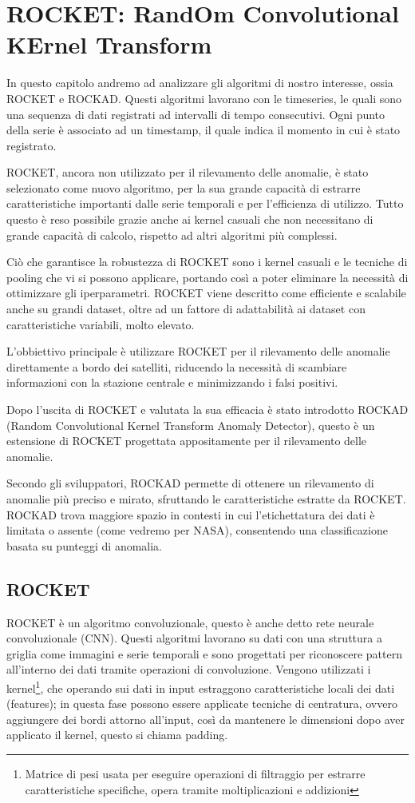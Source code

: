 \chapter{ ROCKET: RandOm Convolutional KErnel Transform}
In questo capitolo andremo ad analizzare gli algoritmi di nostro interesse, ossia ROCKET e ROCKAD.
Questi algoritmi lavorano con le timeseries, le quali sono una sequenza di dati registrati ad intervalli di tempo consecutivi. Ogni punto della serie è associato ad un timestamp, il quale indica il momento in cui è stato registrato.

ROCKET, ancora non utilizzato per il rilevamento delle anomalie, è stato selezionato come nuovo algoritmo, per la sua grande capacità di estrarre caratteristiche importanti dalle serie temporali e per l'efficienza di utilizzo.
Tutto questo è reso possibile grazie anche ai kernel casuali che non necessitano di grande capacità di calcolo, rispetto ad altri algoritmi più complessi.

Ciò che garantisce la robustezza di ROCKET sono i kernel casuali e le tecniche di pooling che vi si possono applicare, portando così a poter eliminare la necessità di ottimizzare gli iperparametri.
ROCKET viene descritto come efficiente e scalabile anche su grandi dataset, oltre ad un fattore di adattabilità ai dataset con caratteristiche variabili, molto elevato.

L'obbiettivo principale è utilizzare ROCKET per il rilevamento delle anomalie direttamente a bordo dei satelliti, riducendo la necessità di scambiare informazioni con la stazione centrale e minimizzando i falsi positivi.

Dopo l'uscita di ROCKET e valutata la sua efficacia è stato introdotto ROCKAD (Random Convolutional Kernel Transform Anomaly Detector), questo è un estensione di ROCKET progettata appositamente per il rilevamento delle anomalie.

Secondo gli sviluppatori, ROCKAD permette di ottenere un rilevamento di anomalie più preciso e mirato, sfruttando le caratteristiche estratte da ROCKET.
ROCKAD trova maggiore spazio in contesti in cui l'etichettatura dei dati è limitata o assente (come vedremo per NASA), consentendo una classificazione basata su punteggi di anomalia.

\section{ROCKET}
ROCKET è un algoritmo convoluzionale, questo è anche detto rete neurale convoluzionale (CNN). Questi algoritmi lavorano su dati con una struttura a griglia come immagini e serie temporali e sono progettati per riconoscere pattern all'interno dei dati tramite operazioni di convoluzione.
Vengono utilizzati i kernel\footnote{Matrice di pesi usata per eseguire operazioni di filtraggio per estrarre caratteristiche specifiche, opera tramite moltiplicazioni e addizioni}, che operando sui dati in input estraggono caratteristiche locali dei dati (features); in questa fase possono essere applicate tecniche di centratura, ovvero aggiungere dei bordi attorno all'input, così da mantenere le dimensioni dopo aver applicato il kernel, questo si chiama padding.

